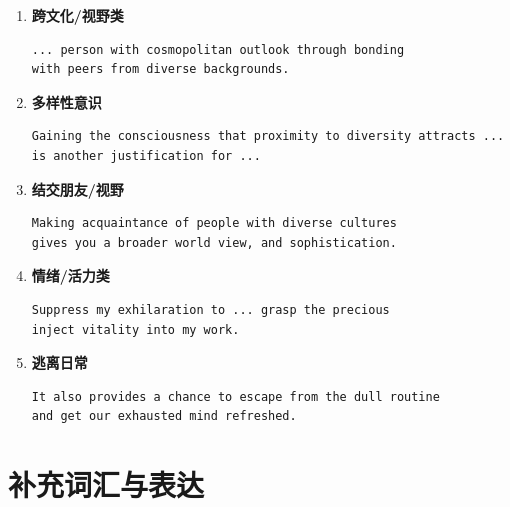 \begin{enumerate}
\item \textbf{跨文化/视野类}
\begin{verbatim}
... person with cosmopolitan outlook through bonding 
with peers from diverse backgrounds.
\end{verbatim}

\item \textbf{多样性意识}
\begin{verbatim}
Gaining the consciousness that proximity to diversity attracts ...
is another justification for ...
\end{verbatim}

\item \textbf{结交朋友/视野}
\begin{verbatim}
Making acquaintance of people with diverse cultures 
gives you a broader world view, and sophistication.
\end{verbatim}

\item \textbf{情绪/活力类}
\begin{verbatim}
Suppress my exhilaration to ... grasp the precious 
inject vitality into my work.
\end{verbatim}

\item \textbf{逃离日常}
\begin{verbatim}
It also provides a chance to escape from the dull routine 
and get our exhausted mind refreshed.
\end{verbatim}

\end{enumerate}


\section*{补充词汇与表达}

